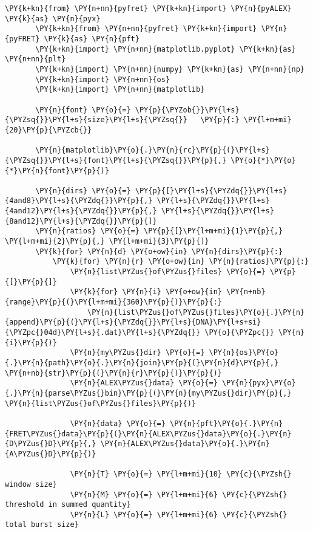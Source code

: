\begin{Verbatim}[commandchars=\\\{\}, fontsize=\scriptsize]
       \PY{k+kn}{from} \PY{n+nn}{pyfret} \PY{k+kn}{import} \PY{n}{pyALEX} \PY{k}{as} \PY{n}{pyx}
       \PY{k+kn}{from} \PY{n+nn}{pyfret} \PY{k+kn}{import} \PY{n}{pyFRET} \PY{k}{as} \PY{n}{pft}
       \PY{k+kn}{import} \PY{n+nn}{matplotlib.pyplot} \PY{k+kn}{as} \PY{n+nn}{plt}
       \PY{k+kn}{import} \PY{n+nn}{numpy} \PY{k+kn}{as} \PY{n+nn}{np}
       \PY{k+kn}{import} \PY{n+nn}{os}
       \PY{k+kn}{import} \PY{n+nn}{matplotlib}
       
       \PY{n}{font} \PY{o}{=} \PY{p}{\PYZob{}}\PY{l+s}{\PYZsq{}}\PY{l+s}{size}\PY{l+s}{\PYZsq{}}   \PY{p}{:} \PY{l+m+mi}{20}\PY{p}{\PYZcb{}}
       
       \PY{n}{matplotlib}\PY{o}{.}\PY{n}{rc}\PY{p}{(}\PY{l+s}{\PYZsq{}}\PY{l+s}{font}\PY{l+s}{\PYZsq{}}\PY{p}{,} \PY{o}{*}\PY{o}{*}\PY{n}{font}\PY{p}{)}

       \PY{n}{dirs} \PY{o}{=} \PY{p}{[}\PY{l+s}{\PYZdq{}}\PY{l+s}{4and8}\PY{l+s}{\PYZdq{}}\PY{p}{,} \PY{l+s}{\PYZdq{}}\PY{l+s}{4and12}\PY{l+s}{\PYZdq{}}\PY{p}{,} \PY{l+s}{\PYZdq{}}\PY{l+s}{8and12}\PY{l+s}{\PYZdq{}}\PY{p}{]}
       \PY{n}{ratios} \PY{o}{=} \PY{p}{[}\PY{l+m+mi}{1}\PY{p}{,} \PY{l+m+mi}{2}\PY{p}{,} \PY{l+m+mi}{3}\PY{p}{]}
       \PY{k}{for} \PY{n}{d} \PY{o+ow}{in} \PY{n}{dirs}\PY{p}{:}
           \PY{k}{for} \PY{n}{r} \PY{o+ow}{in} \PY{n}{ratios}\PY{p}{:}      
               \PY{n}{list\PYZus{}of\PYZus{}files} \PY{o}{=} \PY{p}{[}\PY{p}{]}
               \PY{k}{for} \PY{n}{i} \PY{o+ow}{in} \PY{n+nb}{range}\PY{p}{(}\PY{l+m+mi}{360}\PY{p}{)}\PY{p}{:}
                   \PY{n}{list\PYZus{}of\PYZus{}files}\PY{o}{.}\PY{n}{append}\PY{p}{(}\PY{l+s}{\PYZdq{}}\PY{l+s}{DNA}\PY{l+s+si}{\PYZpc{}04d}\PY{l+s}{.dat}\PY{l+s}{\PYZdq{}} \PY{o}{\PYZpc{}} \PY{n}{i}\PY{p}{)}
               \PY{n}{my\PYZus{}dir} \PY{o}{=} \PY{n}{os}\PY{o}{.}\PY{n}{path}\PY{o}{.}\PY{n}{join}\PY{p}{(}\PY{n}{d}\PY{p}{,} \PY{n+nb}{str}\PY{p}{(}\PY{n}{r}\PY{p}{)}\PY{p}{)}
               \PY{n}{ALEX\PYZus{}data} \PY{o}{=} \PY{n}{pyx}\PY{o}{.}\PY{n}{parse\PYZus{}bin}\PY{p}{(}\PY{n}{my\PYZus{}dir}\PY{p}{,} \PY{n}{list\PYZus{}of\PYZus{}files}\PY{p}{)}
               
               \PY{n}{data} \PY{o}{=} \PY{n}{pft}\PY{o}{.}\PY{n}{FRET\PYZus{}data}\PY{p}{(}\PY{n}{ALEX\PYZus{}data}\PY{o}{.}\PY{n}{D\PYZus{}D}\PY{p}{,} \PY{n}{ALEX\PYZus{}data}\PY{o}{.}\PY{n}{A\PYZus{}D}\PY{p}{)}
                   
               \PY{n}{T} \PY{o}{=} \PY{l+m+mi}{10} \PY{c}{\PYZsh{} window size}
               \PY{n}{M} \PY{o}{=} \PY{l+m+mi}{6} \PY{c}{\PYZsh{} threshold in summed quantity}
               \PY{n}{L} \PY{o}{=} \PY{l+m+mi}{6} \PY{c}{\PYZsh{} total burst size}
                   

\end{Verbatim}
